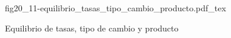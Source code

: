 \begin{figure}[h]
\centering
\def\svgwidth{0.9\textwidth}
{fig20_11-equilibrio_tasas_tipo_cambio_producto.pdf_tex}
\caption{Equilibrio de tasas, tipo de cambio y producto}
\label{fig20_11-equilibrio_tasas_tipo_cambio_producto}
\end{figure}
